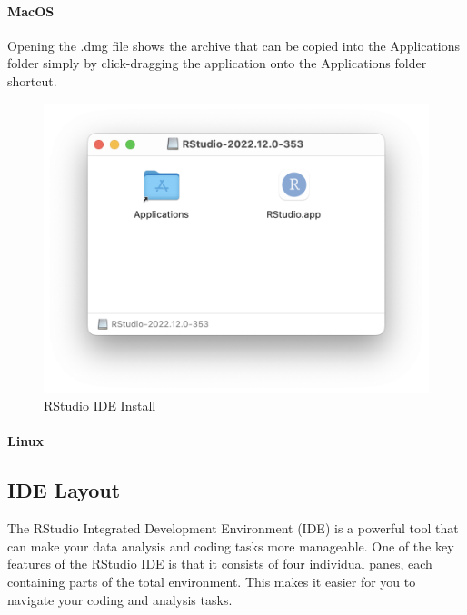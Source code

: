 \documentclass[
]{book}
\begin{document}
\hypertarget{macos-1}{%
\paragraph*{MacOS}\label{macos-1}}

Opening the .dmg file shows the archive that can be copied into the Applications folder simply by click-dragging the application onto the Applications folder shortcut.

\begin{figure}
\includegraphics[width=13.58in]{images/02_011_rstudio_installer_mac} \caption{\label{fig:2011}RStudio IDE Install}\label{fig:2011}
\end{figure}

\hypertarget{linux-1}{%
\paragraph*{Linux}\label{linux-1}}

\hypertarget{ide-layout}{%
\subsection{IDE Layout}\label{ide-layout}}

The RStudio Integrated Development Environment (IDE) is a powerful tool that can make your data analysis and coding tasks more manageable. One of the key features of the RStudio IDE is that it consists of four individual panes, each containing parts of the total environment. This makes it easier for you to navigate your coding and analysis tasks.
\end{document}
